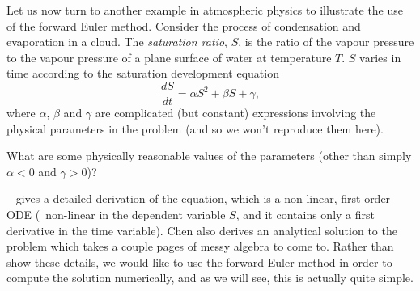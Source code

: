 \begin{example}
  \label{lab1:exm:saturation}
  Let us now turn to another example in atmospheric physics to
  illustrate the use of the forward Euler method. 
  Consider the process of condensation and evaporation in a cloud. 
  The \emph{saturation ratio}, $S$, is the ratio of the vapour pressure
  to the vapour pressure of a plane surface of water at temperature
  $T$.  $S$ varies in time according to the saturation development
  equation 
  \begin{equation}
    \frac{dS}{dt} = \alpha S^2 + \beta S + \gamma,
    \label{lab1:eq:saturation}
  \end{equation}
  where $\alpha$, $\beta$ and $\gamma$ are complicated (but constant)
  expressions involving the physical parameters in the problem (and so
  we won't reproduce them here).  

  \begin{note}
    What are some physically reasonable values of the
    parameters (other than simply $\alpha<0$ and $\gamma>0$)?   
  \end{note}

  ~\cite{chen} gives a detailed derivation of the equation, which
  is a non-linear, first order ODE (\ie~non-linear in the dependent
  variable $S$, and it contains only a
  first derivative in the time variable). 
  Chen also derives an analytical solution to the problem which takes
  a couple pages of messy algebra to come to.
  Rather than show these
  details, we would like to use the forward Euler method in order to
  compute the solution numerically, and as we will see, this is
  actually quite simple.


\end{example}
